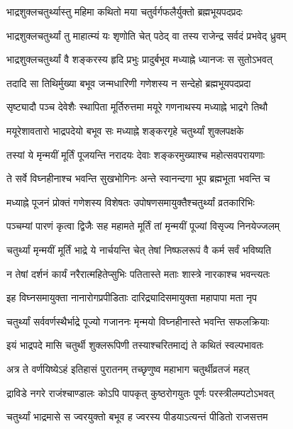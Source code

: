 \twolineshloka
{भाद्रशुक्लचतुर्थ्यास्तु महिमा कथितो मया}
{चतुर्वर्गफलैर्युक्तो ब्रह्मभूयपदप्रदः} %

\twolineshloka
{भाद्रशुक्लचतुर्थ्यां तु माहात्म्यं यः श‍ृणोति चेत्}
{पठेद् वा तस्य राजेन्द्र सर्वदं प्रभवेद् ध्रुवम्} %

\twolineshloka
{भाद्रशुक्लचतुर्थ्यां वै शङ्करस्य हृदि प्रभुः}
{प्रादुर्बभूव मध्याह्ने ध्यानजः स सुतोऽभवत्} %

\twolineshloka
{तदादि सा तिथिर्मुख्या बभूव जन्मधारिणी}
{गणेशस्य न सन्देहो ब्रह्मभूयपदप्रदा} %

\twolineshloka
{सृष्ट्यादौ पञ्च देवेशैः स्थापिता मूर्तिरुत्तमा}
{मयूरे गणनाथस्य मध्याह्ने भाद्रगे तिथौ} %

\twolineshloka
{मयूरेशावतारो भाद्रपदेयो बभूव सः}
{मध्याह्ने शङ्करगृहे चतुर्थ्यां शुक्लपक्षके} %

\twolineshloka
{तस्यां ये मृन्मयीं मूर्तिं पूजयन्ति नरादयः}
{देवाः शङ्करमुख्याश्च महोत्सवपरायणाः} %

\twolineshloka
{ते सर्वे विघ्नहीनाश्च भवन्ति सुखभोगिनः}
{अन्ते स्वानन्दगा भूप ब्रह्मभूता भवन्ति च} %

\twolineshloka
{मध्याह्ने पूजनं प्रोक्तं गणेशस्य विशेषतः}
{उपोषणसमायुक्तैश्चतुर्थ्यां व्रतकारिभिः} %

\twolineshloka
{पञ्चम्यां पारणं कृत्वा द्विजैः सह महामते}
{मूर्तिं तां मृन्मयीं पूज्यां विसृज्य निनयेज्जलम्} %

\twolineshloka
{चतुर्थ्यां मृन्मयीं मूर्तिं भाद्रे ये नार्चयन्ति चेत्}
{तेषां निष्फलरूपं वै कर्म सर्वं भविष्यति} %

\twolineshloka
{न तेषां दर्शनं कार्यं नरैरात्महितेप्सुभिः}
{पतितास्ते मताः शास्त्रे नारकाश्च भवन्त्यतः} %

\twolineshloka
{इह विघ्नसमायुक्ता नानारोगप्रपीडिताः}
{दारिद्र्यादिसमायुक्ता महापापा मता नृप} %

\twolineshloka
{चतुर्थ्यां सर्ववर्णस्थैर्भाद्रे पूज्यो गजाननः}
{मृन्मयो विघ्नहीनास्ते भवन्ति सफलक्रियाः} %

\twolineshloka
{इयं भाद्रपदे मासि चतुर्थी शुक्लरूपिणी}
{तस्याश्चरितमाद्यं ते कथितं स्वल्पभावतः} %

\twolineshloka
{अत्र ते वर्णयिष्येऽहं इतिहासं पुरातनम्}
{तच्छृणुष्व महाभाग चतुर्थीव्रतजं महत्} %

\twolineshloka
{द्राविडे नगरे राजंश्चाण्डालः कोऽपि पापकृत्}
{कुष्ठरोगयुतः पूर्णः परस्त्रीलम्पटोऽभवत्} %

\twolineshloka
{चतुर्थ्यां भाद्रमासे स ज्वरयुक्तो बभूव ह}
{ज्वरस्य पीडयाऽत्यन्तं पीडितो राजसत्तम} %

